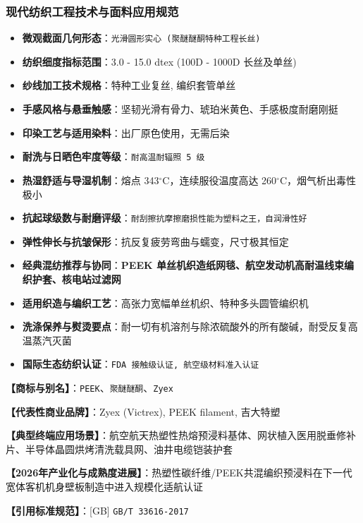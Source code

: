 \documentclass[11pt,openright,twoside,UTF8]{ctexbook}
\begin{document}
\subsubsection*{现代纺织工程技术与面料应用规范}
\begin{itemize} \setlength{\itemsep}{2pt}
    \item \textbf{微观截面几何形态}：\texttt{光滑圆形实心 (聚醚醚酮特种工程长丝)}
    \item \textbf{纺织细度指标范围}：3.0 - 15.0 dtex (100D - 1000D 长丝及单丝)
    \item \textbf{纱线加工技术规格}：特种工业复丝, 编织套管单丝
    \item \textbf{手感风格与悬垂触感}：坚韧光滑有骨力、琥珀米黄色、手感极度耐磨刚挺
    \item \textbf{印染工艺与适用染料}：出厂原色使用，无需后染
    \item \textbf{耐洗与日晒色牢度等级}：\texttt{耐高温耐辐照 5 级}
    \item \textbf{热湿舒适与导湿机制}：熔点 343$^\circ\mathrm{C}$，连续服役温度高达 260$^\circ\mathrm{C}$，烟气析出毒性极小
    \item \textbf{抗起球级数与耐磨评级}：\texttt{耐刮擦抗摩擦磨损性能为塑料之王，自润滑性好}
    \item \textbf{弹性伸长与抗皱保形}：抗反复疲劳弯曲与蠕变，尺寸极其恒定
    \item \textbf{经典混纺推荐与协同}：\textbf{PEEK 单丝机织造纸网毯、航空发动机高耐温线束编织护套、核电站过滤网}
    \item \textbf{适用织造与编织工艺}：高张力宽幅单丝机织、特种多头圆管编织机
    \item \textbf{洗涤保养与熨烫要点}：耐一切有机溶剂与除浓硫酸外的所有酸碱，耐受反复高温蒸汽灭菌
    \item \textbf{国际生态纺织认证}：\texttt{FDA 接触级认证, 航空级材料准入认证}
\end{itemize}
\vspace{0.2cm}

\noindent\textbf{【商标与别名】}：\texttt{PEEK}、\texttt{聚醚醚酮}、\texttt{Zyex}\par
\noindent\textbf{【代表性商业品牌】}：Zyex (Victrex), PEEK filament, 吉大特塑\par
\noindent\textbf{【典型终端应用场景】}：航空航天热塑性热熔预浸料基体、网状植入医用脱垂修补片、半导体晶圆烘烤清洗载具网、油井电缆铠装护套\par
\noindent\textbf{【2026年产业化与成熟度进展】}：热塑性碳纤维/PEEK共混编织预浸料在下一代宽体客机机身壁板制造中进入规模化适航认证\par
\noindent\textbf{【引用标准规范】}：[GB] \texttt{GB/T 33616-2017}\par
\vspace{0.5cm}
\end{document}
